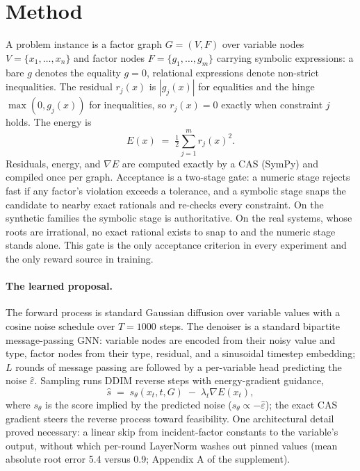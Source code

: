 \documentclass[letterpaper]{article} %
\begin{document}
\section{Method}
\label{sec:method}

A problem instance is a factor graph $G = (V, F)$ over variable nodes $V = \{x_1, \dots,
x_n\}$ and factor nodes $F = \{g_1, \dots, g_m\}$ carrying symbolic expressions: a bare $g$
denotes the equality $g = 0$, relational expressions denote non-strict inequalities. The
residual $r_j(x)$ is $|g_j(x)|$ for equalities and the hinge $\max(0, g_j(x))$ for
inequalities, so $r_j(x) = 0$ exactly when constraint $j$ holds. The energy is
\begin{equation}
E(x) \;=\; \tfrac{1}{2} \sum_{j=1}^{m} r_j(x)^2 .
\end{equation}
Residuals, energy, and $\nabla E$ are computed exactly by a CAS (SymPy) and compiled once per
graph. Acceptance is a two-stage gate: a numeric stage rejects fast if any factor's violation exceeds
a tolerance, and a symbolic stage snaps the candidate to nearby exact rationals and re-checks
every constraint. On the synthetic families the symbolic stage is
authoritative. On the real systems, whose roots are irrational, no exact rational exists to snap to
and the numeric stage stands alone. This gate is the only acceptance criterion in every
experiment and the only reward source in training.

\paragraph{The learned proposal.}
The forward process is standard Gaussian diffusion over variable values with a cosine noise
schedule over $T = 1000$ steps. The denoiser is a standard bipartite message-passing GNN: variable
nodes are encoded from their noisy value and type, factor nodes from their type,
residual, and a sinusoidal timestep embedding; $L$ rounds of message
passing are followed by a per-variable head predicting the noise
$\hat{\varepsilon}$. Sampling runs DDIM reverse steps with energy-gradient guidance,
\begin{equation}
\hat{s} \;=\; s_\theta(x_t, t, G) \;-\; \lambda_t \nabla E(x_t),
\end{equation}
where $s_\theta$ is the score implied by the predicted noise ($s_\theta \propto
-\hat{\varepsilon}$); the exact CAS gradient steers the reverse process toward feasibility.
One architectural detail proved necessary: a linear skip from incident-factor constants
to the variable's output, without which per-round LayerNorm washes out pinned values
(mean absolute root error 5.4 versus 0.9; Appendix A of the supplement).
\end{document}
